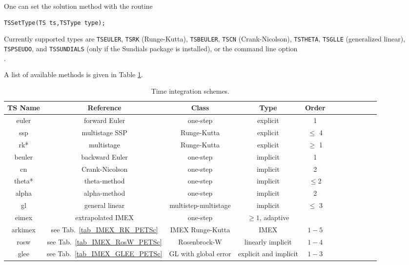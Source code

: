 \noindent One can set the solution method with the routine
\begin{lstlisting}
TSSetType(TS ts,TSType type);
\end{lstlisting}
Currently supported types are \lstinline{TSEULER}, \lstinline{TSRK} (Runge-Kutta), 
\lstinline{TSBEULER}, \lstinline{TSCN} (Crank-Nicolson), \lstinline{TSTHETA}, \lstinline{TSGLLE} (generalized linear), \lstinline{TSPSEUDO}, and  
\lstinline{TSSUNDIALS} (only if the Sundials package is installed),  
or the command line option \\
.
 

A list of available methods is given in Table \ref{tab_TSPET}.

%
\begin{table}
\centering
\begin{tabular}{cccccccccccc}
{\bf TS Name}&{\bf Reference}&{\bf Class}& {\bf Type}&{\bf Order}\\
\hline
euler&forward Euler&one-step&explicit&1\\
ssp&multistage SSP \cite{Ketcheson_2008}&Runge-Kutta&explicit&$\le$ 4\\
rk*&multistage&Runge-Kutta&explicit&$\ge$ 1\\
beuler&backward Euler&one-step&implicit&1\\
cn&Crank-Nicolson&one-step&implicit&2\\
theta*&theta-method&one-step&implicit&$\le$2\\
alpha&alpha-method \cite{Jansen_2000}&one-step&implicit&2\\
gl&general linear
\cite{Butcher_2007}&multistep-multistage&implicit& $\le$ 3\\
eimex&extrapolated IMEX \cite{Constantinescu_A2010a}&one-step&$\ge
1$, adaptive&\\
arkimex&  see Tab.\ \ref{tab_IMEX_RK_PETSc}& IMEX Runge-Kutta & IMEX& $1-5$\\
rosw& see Tab.\ \ref{tab_IMEX_RosW_PETSc} &Rosenbrock-W &linearly
implicit&$1-4$\\
glee& see Tab.\ \ref{tab_IMEX_GLEE_PETSc} &GL with global
error&explicit and implicit&$1-3$\\
\hline
\end{tabular}%
\caption{Time integration schemes.}
\label{tab_TSPET}
\end{table}

